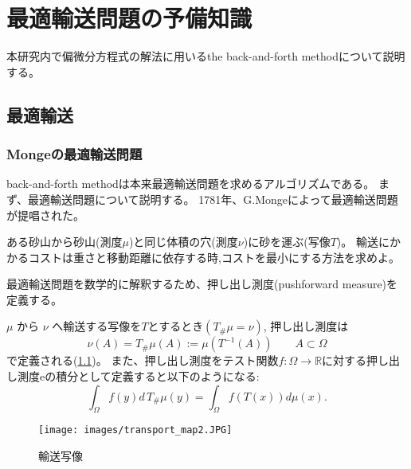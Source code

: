 \chapter{最適輸送問題の予備知識} \label{ch:optimal-transport}

本研究内で偏微分方程式の解法に用いるthe back-and-forth methodについて説明する。

\section{最適輸送}
\label{sect:最適輸送}
\subsection{Mongeの最適輸送問題}
\label{sect:Mongeの最適輸送問題}
back-and-forth methodは本来最適輸送問題を求めるアルゴリズムである。
まず、最適輸送問題について説明する。
1781年、G.Mongeによって最適輸送問題が提唱された。

\begin{monge}
    ある砂山から砂山(測度$\mu$)と同じ体積の穴(測度$\nu$)に砂を運ぶ(写像$T$)。
    輸送にかかるコストは重さと移動距離に依存する時,コストを最小にする方法を求めよ。
\end{monge}

最適輸送問題を数学的に解釈するため、押し出し測度(pushforward measure)を定義する。
\begin{dfn}
    $\mu$ から $\nu$ へ輸送する写像を$T$とするとき$(T_\#\mu = \nu)$,
    押し出し測度は
    \begin{equation*}
        \nu (A) =  T_\#\mu (A) := \mu (T^{-1} (A)) \qquad A \subset \Omega
    \end{equation*}
    で定義される(\ref{fig:pushforward measure})。
    また、押し出し測度をテスト関数$f: \Omega \to \mathbb{R}$に対する押し出し測度eの積分として定義すると以下のようになる:
    \begin{equation}
        \label{def:pushforward_int}
        \int_{\Omega} f(y)d\, T_\# \mu (y) = \int_\Omega f(T(x)) d \mu(x).
      \end{equation}
\end{dfn}

\begin{figure}[htbp]
    \label{fig:pushforward measure}
    \begin{center}
        \texttt{[image: images/transport\_map2.JPG]}
        \caption{輸送写像}
    \end{center}
\end{figure}

